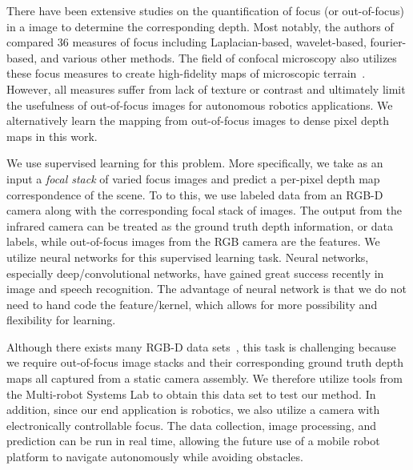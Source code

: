 \documentclass[letterpaper, 10 pt, conference]{ieeeconf}  %
\begin{document}
There have been extensive studies on the quantification of focus (or out-of-focus) in a image to determine the corresponding depth. Most notably, the authors of~\cite{pertuz2013analysis} compared 36 measures of focus including Laplacian-based, wavelet-based, fourier-based, and various other methods. The field of confocal microscopy also utilizes these focus measures to create high-fidelity maps of microscopic terrain~\cite{nayar1994shape}. However, all measures suffer from lack of texture or contrast and ultimately limit the usefulness of out-of-focus images for autonomous robotics applications. We alternatively learn the mapping from out-of-focus images to dense pixel depth maps in this work. 

We use supervised learning for this problem. More specifically, we take as an input a \textit{focal stack} of varied focus images and predict a per-pixel depth map correspondence of the scene. To to this, we use labeled data from an RGB-D camera along with the corresponding focal stack of images. The output from the infrared camera can be treated as the ground truth depth information, or data labels, while out-of-focus images from the RGB camera are the features. We utilize neural networks for this supervised learning task. Neural networks, especially deep/convolutional networks, have gained great success recently in image and speech recognition. The advantage of neural network is that we do not need to hand code the feature/kernel, which allows for more possibility and flexibility for learning. 

Although there exists many RGB-D data sets~\cite{lai2011large, sturm2012benchmark, shotton2013scene}, this task is challenging because we require out-of-focus image stacks and their corresponding ground truth depth maps all captured from a static camera assembly. We therefore utilize tools from the Multi-robot Systems Lab to obtain this data set to test our method. In addition, since our end application is robotics, we also utilize a camera with electronically controllable focus. The data collection, image processing, and prediction can be run in real time, allowing the future use of a mobile robot platform to navigate autonomously while avoiding obstacles. 
\end{document}
